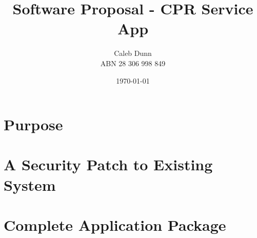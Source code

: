 \documentclass[12pt]{article}
\title{Software Proposal - CPR Service App}
\author{ Caleb Dunn \\ ABN 28 306 998 849}
\date{\today}
\begin{document}
    \maketitle
    \pagebreak
    \tableofcontents


    \pagebreak
    \section{Purpose}\label{sec:purpose}
    

    \pagebreak
    \section{A Security Patch to Existing System}\label{sec:a-security-patch-to-existing-system}
    

    \pagebreak
    \section{Complete Application Package}\label{sec:entire-application-package}
    
\end{document}
